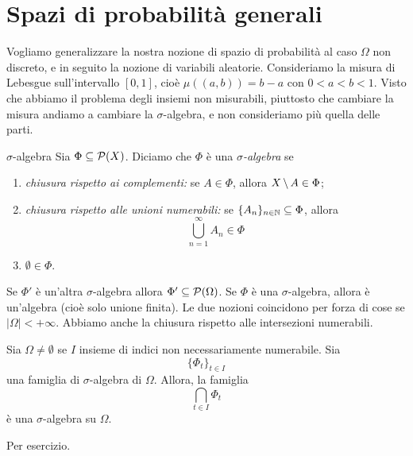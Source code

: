 \documentclass[a4paper]{article}
\begin{document}
\section{Spazi di probabilità generali}

Vogliamo generalizzare la nostra nozione di spazio di probabilità al caso
\(\Omega\) non discreto, e in seguito la nozione di variabili aleatorie.
Consideriamo la misura di Lebesgue sull'intervallo \([0,1]\),
cioè \(\mu((a,b)) = b-a\) con \(0 < a < b < 1\).
Visto che abbiamo il problema degli insiemi non misurabili, piuttosto che
cambiare la misura andiamo a cambiare la \(\sigma\)-algebra,
e non consideriamo più quella delle parti.

\begin{snippetdefinition}{\(\sigma\)-algebra}
    Sia \(\Phi \subseteq \mathcal P(X)\). Diciamo che \(\Phi\) è una \emph{\(\sigma\)-algebra}
    se
    \begin{enumerate}
        \item \emph{chiusura rispetto ai complementi:} se \(A \in \Phi\), allora \(X \,\backslash\, A \in \Phi\);
        \item \emph{chiusura rispetto alle unioni numerabili:} se \(\{A_n\}_{n \in \mathbb{N}} \subseteq \Phi\), allora
            \[
                \bigcup_{n=1}^\infty A_n \in \Phi
            \]
        \item \(\emptyset \in \Phi\).
    \end{enumerate}
\end{snippetdefinition}

Se \(\Phi'\) è un'altra \(\sigma\)-algebra allora
\(\Phi' \subseteq \mathcal P(\Omega)\).
Se \(\Phi\) è una \(\sigma\)-algebra, allora è un'algebra (cioè solo unione finita).
Le due nozioni coincidono per forza di cose se \(|\Omega| < +\infty\).
Abbiamo anche la chiusura rispetto alle intersezioni numerabili.

\begin{snippetproposition}{}
    Sia \(\Omega \neq \emptyset\) se \(I\)
    insieme di indici non necessariamente numerabile.
    Sia
    \[
        \{\Phi_t\}_{t \in I}
    \]
    una famiglia di \(\sigma\)-algebra di \(\Omega\).
    Allora, la famiglia
    \[
        \bigcap_{t \in I} \Phi_t
    \]
    è una \(\sigma\)-algebra su \(\Omega\).
\end{snippetproposition}

\begin{snippetproof}{}
    Per esercizio.
\end{snippetproof}
\end{document}
